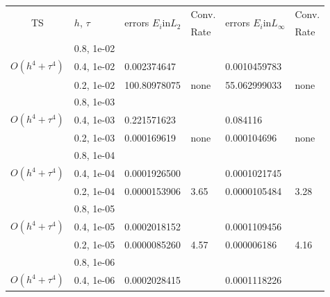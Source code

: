 \documentclass[%
 aip,
cp,  
 amsmath,amssymb,
 reprint,
]{iopconfser}
\begin{document}
\iffalse
\begin{table}[ht]
\centering
\small
		\begin{tabular}{||c|l|ll|ll||}
			\hline
			\hline
      \multirow{2  }{*}{TS}        & \multirow{2  }{*}{$h$, $\tau$}  & \multirow{2  }{*}{errors $E_i$in$L_2$}  &Conv.& \multirow{2  }{*}{errors $E_i$in$L_\infty$}  &Conv.  \\
	         &                    &                               & Rate   &                                        & Rate \\
   			\hline 
					\hline 
                    &0.8, 1e-02          &              &              &                     &      \\
 $O(h^4 + \tau^ 4)$  &0.4, 1e-02          &0.002374647 &            &0.0010459783     &       \\
                     &0.2, 1e-02  & 100.80978075  & none    &55.062999033 &      none      \\
			\hline 
                    &0.8, 1e-03          &              &              &                     &      \\
$O(h^4 + \tau^ 4)$    &0.4, 1e-03          &0.221571623 &            & 0.084116     &       \\
                    &0.2, 1e-03  & 0.000169619  & none   &0.000104696 &     none      \\
			\hline
                    &0.8, 1e-04          &              &              &                     &      \\
     $O(h^4 + \tau^ 4)$  &0.4, 1e-04          &0.0001926500 &            & 0.0001021745    &       \\
                    &0.2, 1e-04  & 0.0000153906  & 3.65   &0.0000105484 &     3.28      \\
    \hline
                    &0.8, 1e-05          &              &              &                     &      \\
     $O(h^4 + \tau^ 4)$   &0.4, 1e-05          &0.0002018152 &            & 0.0001109456    &       \\
                    &0.2, 1e-05  & 0.0000085260 & 4.57   &0.000006186 &      4.16      \\
    \hline
                    &0.8, 1e-06          &              &              &                     &      \\
     $O(h^4 + \tau^ 4)$ &0.4, 1e-06          &0.0002028415 &            & 0.0001118226    &       \\

\end{tabular}
\end{table}
\end{document}
